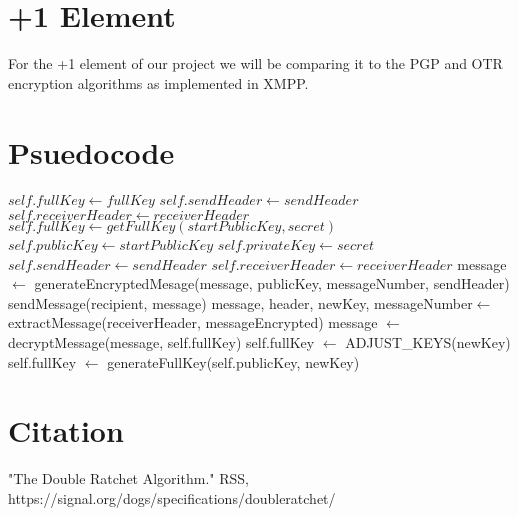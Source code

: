 \documentclass{article}
\begin{document}
\section{+1 Element}

For the +1 element of our project we will be comparing it to the PGP and OTR encryption algorithms as implemented in XMPP.

\section{Psuedocode}

    \begin{algorithm}
    \begin{algorithmic}
		\State $self.fullKey \gets fullKey$
		\State $self.sendHeader \gets sendHeader$
		\State $self.receiverHeader \gets receiverHeader$
	\EndProcedure
		\State $self.fullKey \gets getFullKey(startPublicKey, secret)$
		\State $self.publicKey \gets startPublicKey$
		\State $self.privateKey \gets secret$
		\State $self.sendHeader \gets sendHeader$
		\State $self.receiverHeader \gets receiverHeader$
	\EndProcedure
		\State message $\gets$ generateEncryptedMesage(message, publicKey, messageNumber, sendHeader) 
		\State sendMessage(recipient, message)
	\EndProcedure
		\State message, header, newKey, messageNumber$\gets$ extractMessage(receiverHeader, messageEncrypted)
		\State message $\gets$ decryptMessage(message, self.fullKey) 
		\State self.fullKey $\gets$ ADJUST\_KEYS(newKey)
	\EndProcedure
		\State self.fullKey $\gets$ generateFullKey(self.publicKey, newKey)
	\EndProcedure
    	\end{algorithmic}
    \end{algorithm}

\section{Citation}

"The Double Ratchet Algorithm." RSS, https://signal.org/dogs/specifications/doubleratchet/


    
	
	    
\end{document}
